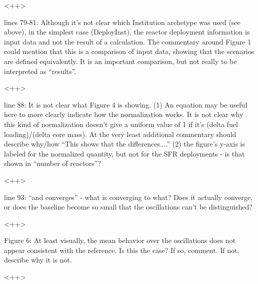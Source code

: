 \documentclass[answers,11pt]{exam}
\begin{document}
\begin{questions}
        \begin{solution}
        <++>
        \end{solution}

        \question lines 79-81: Although it's not clear which Institution 
        archetype was used (see above), in the simplest case (DeployInst), the 
        reactor deployment information is input data and not the result of a 
        calculation.  The commentary around Figure 1 could mention that this is 
        a comparison of input data, showing that the scenarios are defined 
        equivalently.  It is an important comparison, but not really to be 
        interpreted as ``results''.

        \begin{solution}
        <++>
        \end{solution}


        \question line 88: It is not clear what Figure 4 is showing.  (1) An 
        equation may be useful here to more clearly indicate how the 
        normalization works. It is not clear why this kind of normalization 
        doesn't give a uniform value of 1 if it's (delta fuel loading)/(delta 
        core mass).  At the very least additional commentary should describe 
        why/how ``This shows that the differences....''  (2) the figure's 
        y-axis is labeled for the normalized quantity, but not for the SFR 
        deployments - is that shown in ``number of reactors''?

        \begin{solution}
        <++>
        \end{solution}


        \question line 93: ``and converges'' - what is converging to what?  
        Does it actually converge, or does the baseline become so small that 
        the oscillations can't be distinguished?

        \begin{solution}
        <++>
        \end{solution}


        \question Figure 6: At least visually, the mean behavior over the 
        oscillations does not appear consistent with the reference.  Is this 
        the case? If so, comment.  If not, describe why it is not.

        \begin{solution}
        <++>
        \end{solution}


\end{questions}


\end{document}
